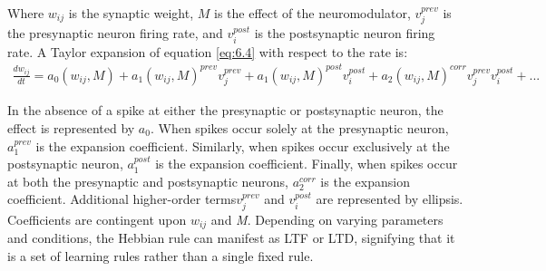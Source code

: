 \noindent Where $w_{ij}$ is the synaptic weight, $M$ is the effect of the neuromodulator, $v^{prev}_j$ is the presynaptic neuron firing rate, and $v^{post}_i$ is the postsynaptic neuron firing rate. A Taylor expansion of equation \ref{eq:6.4} with respect to the rate is:
\begin{align}
\frac{dw_{ij}}{dt} = a_0({w_{ij},M}) + a_1({w_{ij},M})^{prev}v^{prev}_j + a_1({w_{ij},M})^{post}v^{post}_i + a_2({w_{ij},M})^{corr}v^{prev}_jv^{post}_i + ... \label{eq:6.5} 
\end{align}



\noindent In the absence of a spike at either the presynaptic or postsynaptic neuron, the effect is represented by $a_0$. When spikes occur solely at the presynaptic neuron, $a^{prev}_1$ is the expansion coefficient. Similarly, when spikes occur exclusively at the postsynaptic neuron, $a^{post}_1$  is the expansion coefficient. Finally, when spikes occur at both the presynaptic and postsynaptic neurons, $a^{corr}_2$ is the expansion coefficient. Additional higher-order terms$v^{prev}_j$ and $v^{post}_i$ are represented by ellipsis. Coefficients are contingent upon $w_{ij}$ and \textit{M}. Depending on varying parameters and conditions, the Hebbian rule can manifest as LTF or LTD, signifying that it is a set of learning rules rather than a single fixed rule.\\


